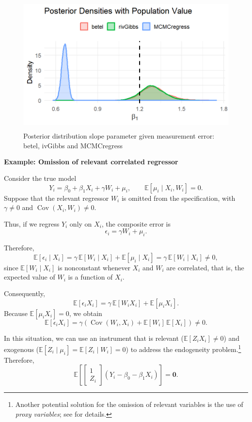 \begin{figure}[h!]
	\includegraphics[width=340pt, height=200pt]{Chapters/chapter12/figures/FigME.png}
	\caption[List of figure caption goes here]{Posterior distribution slope parameter given measurement error: betel, ivGibbs and MCMCregress}\label{fig12_Measurement}
\end{figure} 
 
\textbf{Example: Omission of relevant correlated regressor}

Consider the true model
\[
Y_i = \beta_0 + \beta_1 X_i + \gamma W_i + \mu_i,
\qquad \mathbb{E}[\mu_i \mid X_i, W_i] = 0.
\]
Suppose that the relevant regressor $W_i$ is omitted from the specification, with $\gamma \neq 0$ and \(\operatorname{Cov}(X_i, W_i) \neq 0\).

Thus, if we regress $Y_i$ only on $X_i$, the composite error is
\[
\epsilon_i = \gamma W_i + \mu_i.
\]

Therefore,
\[
\mathbb{E}[\epsilon_i \mid X_i] 
= \gamma \, \mathbb{E}[W_i \mid X_i] + \mathbb{E}[\mu_i \mid X_i]
= \gamma \, \mathbb{E}[W_i \mid X_i] \neq 0,
\]
since $\mathbb{E}[W_i \mid X_i]$ is nonconstant whenever $X_i$ and $W_i$ are correlated, that is, the expected value of $W_i$ is a function of $X_i$.

Consequently,
\[
\mathbb{E}[\epsilon_i X_i] 
= \gamma \, \mathbb{E}[W_i X_i] + \mathbb{E}[\mu_i X_i].
\]
Because $\mathbb{E}[\mu_i X_i]=0$, we obtain
\[
\mathbb{E}[\epsilon_i X_i] = \gamma (\operatorname{Cov}(W_i,X_i) 
+ \mathbb{E}[W_i] \, \mathbb{E}[X_i])\neq 0.
\]

In this situation, we can use an instrument that is relevant ($\mathbb{E}[Z_i X_i] \neq 0$) and exogenous ($\mathbb{E}[Z_i \mid \mu_i] = \mathbb{E}[Z_i \mid W_i] = 0$) to address the endogeneity problem.\footnote{Another potential solution for the omission of relevant variables is the use of \textit{proxy variables}; see \cite{wooldridge2010econometric} for details.} Therefore,
\[
\mathbb{E}\left[\begin{bmatrix}
	1\\
	Z_i
\end{bmatrix}(Y_i-\beta_0-\beta_1X_i)\right]=\mathbf{0}.
\] 

